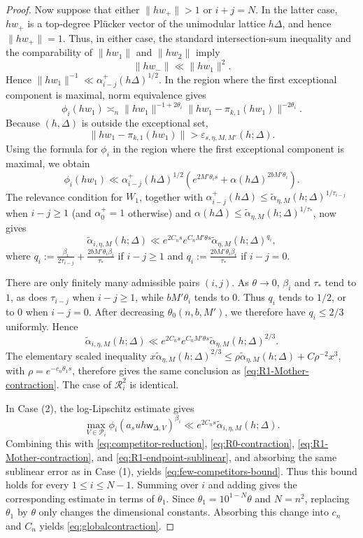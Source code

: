 \documentclass[10pt,a4paper]{amsart}
\begin{document}
\begin{proof}
 Now suppose that either $\|hw_+\|>1$ or $i+j=N$. In the latter
case, $hw_+$ is a top-degree Pl\"ucker vector of the unimodular lattice
$h\Delta$, and hence $\|hw_+\|=1$. Thus, in either case, the standard intersection-sum inequality and the comparability of $\|hw_1\|$ and
$\|hw_2\|$ imply
$$
\|hw_-\|\ll\|hw_1\|^2.
$$
Hence $\|hw_1\|^{-1}\ll
\alpha_{i-j}^+(h\Delta)^{1/2}$. In the region where the first
exceptional component is maximal, norm equivalence gives
$$
\phi_i(hw_1)\asymp_n
\|hw_1\|^{-1+2\theta_i}
\|hw_1-\pi_{k,1}(hw_1)\|^{-2\theta_i}.
$$
Because $(h,\Delta)$ is outside the exceptional set,
$$
\|hw_1-\pi_{k,1}(hw_1)\|
>\varepsilon_{s,\eta,M,M'}(h;\Delta).
$$
Using the formula for $\phi_i$ in the region where the first exceptional
component is maximal, we obtain
$$
\phi_i(hw_1)
\ll
\alpha_{i-j}^+(h\Delta)^{1/2}
\left(
 e^{2M'\theta_is}
 +\alpha(h\Delta)^{2bM'\theta_i}
\right).
$$
The relevance condition for $W_1$, together with
$\alpha_{i-j}^+(h\Delta)
\le \widetilde\alpha_{\eta,M}(h;\Delta)^{1/\tau_{i-j}}$ when $i-j\ge1$
(and $\alpha_0^+=1$ otherwise) and
$\alpha(h\Delta)\le \widetilde\alpha_{\eta,M}(h;\Delta)^{1/\tau_*}$, now gives
$$
\widetilde\alpha_{i,\eta,M}(h;\Delta)
\ll
e^{2C_ns}e^{C_nM'\theta s}
\widetilde\alpha_{\eta,M}(h;\Delta)^{q_i},
$$
where $q_i:=
\frac{\beta_i}{2\tau_{i-j}}
+
\frac{2bM'\theta_i\beta_i}{\tau_*}$ if $i-j\ge 1$ and
$q_i:=
\frac{2bM'\theta_i\beta_i}{\tau_*}$ if $i-j=0$.

There are only finitely many admissible pairs $(i,j)$. As $\theta\to0$,
$\beta_i$ and $\tau_*$ tend to $1$, as does $\tau_{i-j}$ when $i-j\ge 1$,
while $bM'\theta_i$ tends to $0$.
Thus $q_i$ tends to $1/2$, or to $0$ when $i-j=0$.
After decreasing $\theta_0(n,b,M')$, we therefore have $q_i\le2/3$
uniformly. Hence
\begin{equation}\label{eq:R1-endpoint-sublinear}
\widetilde\alpha_{i,\eta,M}(h;\Delta)
\ll e^{2C_ns}e^{C_nM'\theta s}
\widetilde\alpha_{\eta,M}(h;\Delta)^{2/3}.
\end{equation}
The elementary scaled inequality
$x\widetilde\alpha_{\eta,M}(h;\Delta)^{2/3}
\le \rho\widetilde\alpha_{\eta,M}(h;\Delta)+C\rho^{-2}x^3$, with
$\rho=e^{-c_n\theta_1 s}$, therefore gives the same conclusion as
\eqref{eq:R1-Mother-contraction}. The case of $\mathcal R_i^2$ is
identical.

In Case (2), the log-Lipschitz estimate gives
$$
\max_{V\in\mathcal P_i}
\phi_i(a_suh\mathsf w_{\Delta,V})^{\beta_i}
\ll e^{2C_ns}\widetilde\alpha_{i,\eta,M}(h;\Delta).
$$
Combining this with \eqref{eq:competitor-reduction},
\eqref{eq:R0-contraction}, \eqref{eq:R1-Mother-contraction}, and
\eqref{eq:R1-endpoint-sublinear}, and absorbing the same sublinear error as
in Case (1), yields \eqref{eq:few-competitors-bound}. Thus this
bound holds for every $1\le i\le N-1$. Summing over $i$ and adding
 gives the corresponding estimate in
terms of $\theta_1$. Since $\theta_1=10^{1-N}\theta$ and $N=n^2$, replacing
$\theta_1$ by $\theta$ only changes the dimensional constants. Absorbing
this change into $c_n$ and $C_n$ yields \eqref{eq:globalcontraction}.
\end{proof}
\end{document}
